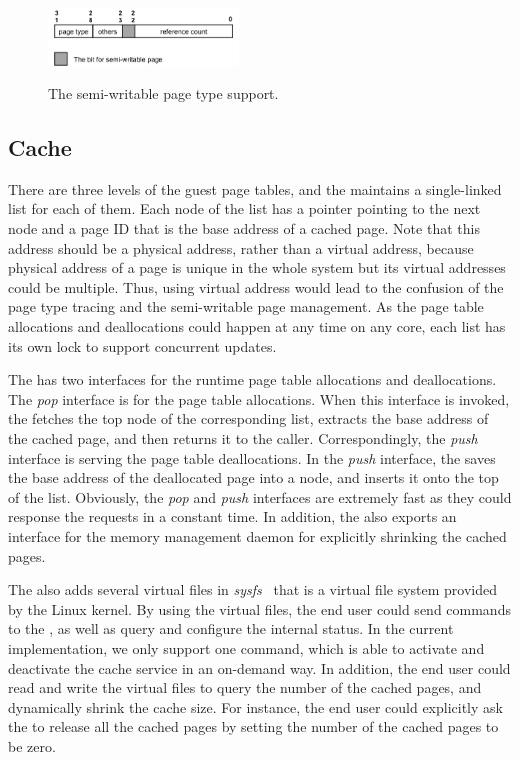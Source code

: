 \begin{figure}[ht]
\centering
\includegraphics[width=0.45\textwidth]{image/implementation/field-of-semi-type.jpg} \\
\caption{The semi-writable page type support.}
\label{fig:field-of-semi-type}
\end{figure}

\subsection{\name Cache}
There are three levels of the guest page tables, and the \cache maintains a single-linked list for each of them.
Each node of the list has a pointer pointing to the next node and a page ID that is the base address of a cached page.
Note that this address should be a physical address, rather than a virtual address, because physical address of a page is unique in the whole system but its virtual addresses could be multiple.
Thus, using virtual address would lead to the confusion of the page type tracing and the semi-writable page management.
As the page table allocations and deallocations could happen at any time on any core, each list has its own lock to support concurrent updates.

The \cache has two interfaces for the runtime page table allocations and deallocations.
The \emph{pop} interface is for the page table allocations.
When this interface is invoked, the \cache fetches the top node of the corresponding list, extracts the base address of the cached page, and then returns it to the caller.
Correspondingly, the \emph{push} interface is serving the page table deallocations.
In the \emph{push} interface, the \cache saves the base address of the deallocated page into a node, and inserts it onto the top of the list.
Obviously, the \emph{pop} and \emph{push} interfaces are extremely fast as they could response the requests in a constant time.
In addition, the \cache also exports an interface for the memory management daemon for explicitly shrinking the cached pages. 

The \cache also adds several virtual files in \emph{sysfs}~\cite{love2004linux,mochel2005sysfs} that is a virtual file system provided by the Linux kernel.
By using the virtual files, the end user could send commands to the \cache,  as well as query and configure the internal status.
In the current implementation, we only support one command, which is able to activate and deactivate the cache service in an on-demand way.
In addition, the end user could read and write the virtual files to query the number of the cached pages, and dynamically shrink the cache size.
For instance, the end user could explicitly ask the \cache to release all the cached pages by setting the number of the cached pages to be zero.

